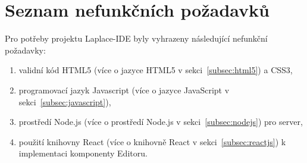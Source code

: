
\section{Seznam nefunkčních požadavků}\label{sec:nefuncniPozadavky}

Pro potřeby projektu Laplace-IDE byly vyhrazeny následující nefunkční požadavky:
\begin{enumerate}
    \item validní kód HTML5 (více o jazyce HTML5 v sekci~\ref{subsec:html5}) a \gls{CSS3},
    \item programovací jazyk Javascript (více o jazyce JavaScript v sekci~\ref{subsec:javascript}),
    \item prostředí Node.js (více o prostředí Node.js v sekci~\ref{subsec:nodejs}) pro server,
    \item použití knihovny React (více o knihovně React v sekci~\ref{subsec:reactjs}) k implementaci komponenty Editoru.
\end{enumerate}
